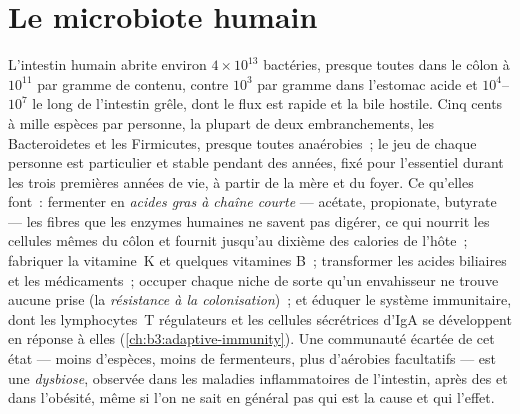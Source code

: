 \section{Le microbiote humain}

\begin{definition}\label{def:b3:microbiomes:gut}
L'intestin humain abrite environ $4\times 10^{13}$ bactéries, presque
toutes dans le côlon à $10^{11}$ par gramme de contenu, contre $10^{3}$
par gramme dans l'estomac acide et $10^{4}$--$10^{7}$ le long de
l'intestin grêle, dont le flux est rapide et la bile hostile. Cinq
cents à mille espèces par personne, la plupart de deux
embranchements, les Bacteroidetes et les Firmicutes, presque toutes
anaérobies~; le jeu de chaque personne est particulier et stable
pendant des années, fixé pour l'essentiel durant les trois premières
années de vie, à partir de la mère et du foyer. Ce qu'elles font~:
fermenter en \emph{acides gras à chaîne courte} --- acétate,
propionate, butyrate --- les fibres que les enzymes humaines ne savent
pas digérer, ce qui nourrit les cellules mêmes du côlon et fournit
jusqu'au dixième des calories de l'hôte~; fabriquer la vitamine~K et
quelques vitamines B~; transformer les acides biliaires et les
médicaments~; occuper chaque niche de sorte qu'un envahisseur ne trouve
aucune prise (la \emph{résistance à la colonisation})~; et éduquer le
système immunitaire, dont les lymphocytes~T régulateurs et les cellules
sécrétrices d'IgA se développent en réponse à elles
(\cref{ch:b3:adaptive-immunity}). Une communauté écartée de cet état
--- moins d'espèces, moins de fermenteurs, plus d'aérobies facultatifs
--- est une \emph{dysbiose}, observée dans les maladies inflammatoires
de l'intestin, après des  et dans l'obésité, même si l'on
ne sait en général pas qui est la cause et qui l'effet.
\end{definition}


